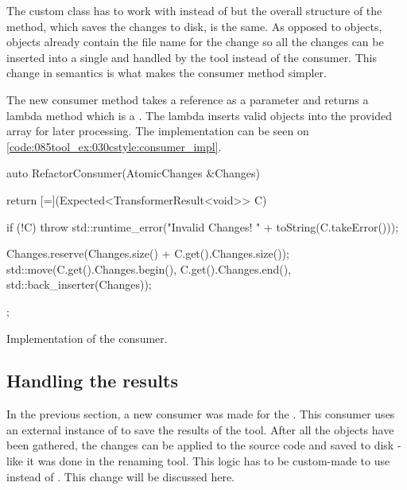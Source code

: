 The custom class has to work with  instead of  but the overall structure of the  method, which saves the changes to disk, is the same. As opposed to  objects, objects already contain the file name for the change so all the changes can be inserted into a single   and handled by the tool instead of the consumer. This change in semantics is what makes the consumer method simpler. 


The new consumer method takes a  reference as a parameter and returns a lambda method which is a . The lambda inserts valid  objects into the provided  array for later processing. The implementation can be seen on \cref{code:085tool_ex:030cstyle:consumer_impl}.

\begin{listing}[H]
    \begin{cppcode}
auto RefactorConsumer(AtomicChanges &Changes) {
        return [=](Expected<TransformerResult<void>> C) {
            if (!C) {
                throw std::runtime_error("Invalid Changes! " + toString(C.takeError()));
            }

            Changes.reserve(Changes.size() + C.get().Changes.size());
			std::move(C.get().Changes.begin(), C.get().Changes.end(),
			          std::back_inserter(Changes));
        };
}
    \end{cppcode}
    \caption{Implementation of the  consumer.}
    \label{code:085tool_ex:030cstyle:consumer_impl}
\end{listing}

\subsection{Handling the results}


In the previous section, a new consumer was made for the . This consumer uses an external instance of  to save the results of the tool. After all the  objects have been gathered, the changes can be applied to the source code and saved to disk - like it was done in the renaming tool. This logic has to be custom-made to use  instead of . This change will be discussed here.

